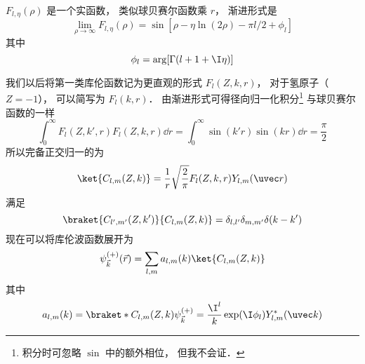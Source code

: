 $F_{l,\eta}(\rho)$ 是一个实函数， 类似球贝赛尔函数乘 $r$， 渐进形式是
\begin{equation}
\lim_{\rho\to \infty} F_{l,\eta}(\rho) = \sin[\rho - \eta\ln(2\rho) - \pi l/2 + \phi_l]
\end{equation}
其中
\begin{equation}
\phi_l = \arg[\Gamma(l+1+\I\eta)]
\end{equation}

我们以后将第一类库伦函数记为更直观的形式 $F_l(Z, k, r)$， 对于氢原子（$Z = -1$）， 可以简写为 $F_l(k, r)$． 由渐进形式可得径向归一化积分\footnote{积分时可忽略 $\sin$ 中的额外相位， 但我不会证．} 与球贝赛尔函数的一样
\begin{equation}
\int_0^\infty F_l(Z, k', r)F_l(Z, k, r) \dd{r} = \int_0^\infty \sin(k'r)\sin(kr) \dd{r} = \frac{\pi}{2}
\end{equation}
所以完备正交归一的为
\begin{equation}
\ket{C_{l,m}(Z,k)} = \frac{1}{r} \sqrt{\frac{2}{\pi}} F_l(Z,k,r) Y_{l,m}(\uvec r)
\end{equation}
满足
\begin{equation}
\braket{C_{l',m'}(Z,k')}{C_{l,m}(Z,k)} = \delta_{l,l'}\delta_{m,m'}\delta(k-k')
\end{equation}
现在可以将库伦波函数展开为
\begin{equation}
\psi_{\vec k}^{(+)}(\vec r) =  \sum_{l,m} a_{l,m}(k) \ket{C_{l,m}(Z,k)}
\end{equation}
其中
\begin{equation}
a_{l,m}(k) =  \braket*{C_{l,m}(Z,k)}{\psi_{\vec k}^{(+)}} = \frac{\I^l}{k} \exp(\I\phi_l) Y_{l,m}^* (\uvec k)
\end{equation}
